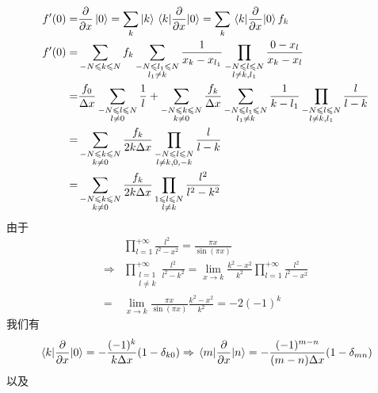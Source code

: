 \documentclass[UTF8,12pt]{article}
\begin{document}
        \begin{align}
            f'(0)=&\pdv{x}\ket{0}=\sum_k{\ket{k}\mel{k}{\pdv{x}}{0}}=\sum_k{\mel{k}{\pdv{x}}{0}f_k} \\
            f'(0)=&\sum_{-N\leqslant k\leqslant N}{f_k\sum_{\substack{-N\leqslant l_1\leqslant N\\l_1\neq k}}{\frac{1}{x_k-x_{l_1}}\prod_{\substack{-N\leqslant l\leqslant N\\l\neq k,l_1}}{\frac{0-x_l}{x_k-x_l}}}} \\
            =&\frac{f_0}{\Delta x}\sum_{\substack{-N\leqslant l\leqslant N\\l\neq 0}}{\frac{1}{l}}+\sum_{\substack{-N\leqslant k\leqslant N\\k\neq 0}}{\frac{f_k}{\Delta x}\sum_{\substack{-N\leqslant l_1\leqslant N\\l_1\neq k}}{\frac{1}{k-l_1}\prod_{\substack{-N\leqslant l\leqslant N\\l\neq k,l_1}}{\frac{l}{l-k}}}} \\
            =&\sum_{\substack{-N\leqslant k\leqslant N\\k\neq 0}}{\frac{f_k}{2k\Delta x}\prod_{\substack{-N\leqslant l\leqslant N\\l\neq k,0,-k}}{\frac{l}{l-k}}} \\
            =&\sum_{\substack{-N\leqslant k\leqslant N\\k\neq 0}}{\frac{f_k}{2k\Delta x}\prod_{\substack{1\leqslant l\leqslant N\\l\neq k}}{\frac{l^2}{l^2-k^2}}} \\
        \end{align}
        由于
        \begin{align}
            &\prod_{l=1}^{+\infty}{\frac{l^2}{l^2-x^2}}=\frac{\pi x}{\sin(\pi x)} \\
            \Rightarrow&\prod_{\substack{l=1\\l\neq k}}^{+\infty}{\frac{l^2}{l^2-k^2}}=\lim_{x\rightarrow k}{\frac{k^2-x^2}{k^2}\prod_{l=1}^{+\infty}{\frac{l^2}{l^2-x^2}}} \\
            =&\lim_{x\rightarrow k}{\frac{\pi x}{\sin(\pi x)}\frac{k^2-x^2}{k^2}}=-2(-1)^k
        \end{align}
        我们有
        \begin{equation}
            \mel{k}{\pdv{x}}{0}=-\frac{(-1)^k}{k\Delta x}(1-\delta_{k0})\Rightarrow\mel{m}{\pdv{x}}{n}=-\frac{(-1)^{m-n}}{(m-n)\Delta x}(1-\delta_{mn})
        \end{equation}
        以及
\end{document}
